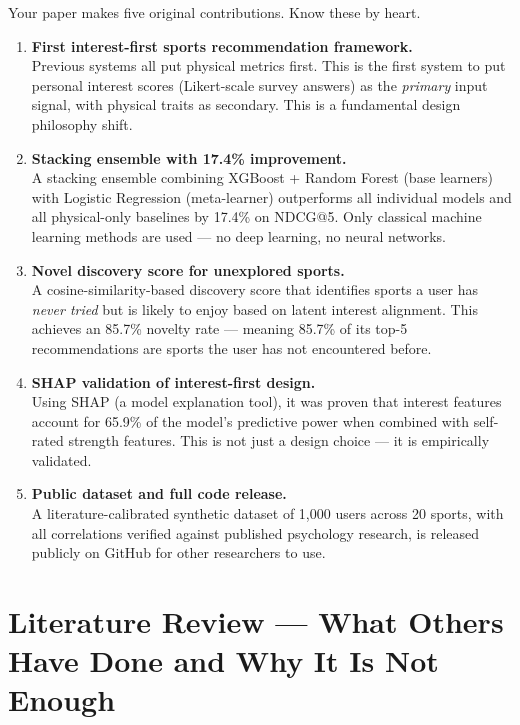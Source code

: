 \documentclass[12pt,a4paper]{article}
\begin{document}
Your paper makes five original contributions. Know these by heart.

\begin{enumerate}[leftmargin=*, label=\textbf{\arabic*.}]

\item \textbf{First interest-first sports recommendation framework.}\\
Previous systems all put physical metrics first. This is the first system
to put personal interest scores (Likert-scale survey answers) as the
\emph{primary} input signal, with physical traits as secondary. This is a
fundamental design philosophy shift.

\item \textbf{Stacking ensemble with 17.4\% improvement.}\\
A stacking ensemble combining XGBoost + Random Forest (base learners) with
Logistic Regression (meta-learner) outperforms all individual models and all
physical-only baselines by 17.4\% on NDCG@5. Only classical machine learning
methods are used --- no deep learning, no neural networks.

\item \textbf{Novel discovery score for unexplored sports.}\\
A cosine-similarity-based discovery score that identifies sports a user has
\emph{never tried} but is likely to enjoy based on latent interest alignment.
This achieves an 85.7\% novelty rate --- meaning 85.7\% of its top-5
recommendations are sports the user has not encountered before.

\item \textbf{SHAP validation of interest-first design.}\\
Using SHAP (a model explanation tool), it was proven that interest features
account for 65.9\% of the model's predictive power when combined with
self-rated strength features. This is not just a design choice --- it is
empirically validated.

\item \textbf{Public dataset and full code release.}\\
A literature-calibrated synthetic dataset of 1,000 users across 20 sports,
with all correlations verified against published psychology research, is
released publicly on GitHub for other researchers to use.

\end{enumerate}

\section{Literature Review --- What Others Have Done and Why It Is Not Enough}
\end{document}

